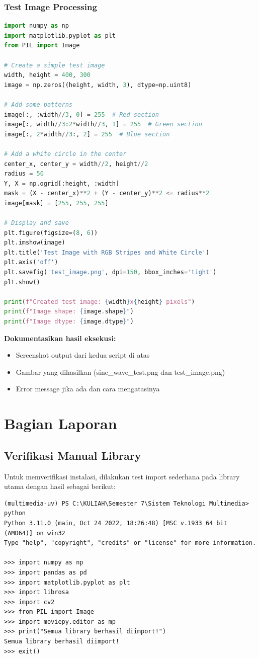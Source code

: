 \documentclass[11pt,a4paper]{article}
\begin{document}
\subsubsection{Test Image Processing}
\begin{lstlisting}[language=Python, caption=Test image processing sederhana]
import numpy as np
import matplotlib.pyplot as plt
from PIL import Image

# Create a simple test image
width, height = 400, 300
image = np.zeros((height, width, 3), dtype=np.uint8)

# Add some patterns
image[:, :width//3, 0] = 255  # Red section
image[:, width//3:2*width//3, 1] = 255  # Green section
image[:, 2*width//3:, 2] = 255  # Blue section

# Add a white circle in the center
center_x, center_y = width//2, height//2
radius = 50
Y, X = np.ogrid[:height, :width]
mask = (X - center_x)**2 + (Y - center_y)**2 <= radius**2
image[mask] = [255, 255, 255]

# Display and save
plt.figure(figsize=(8, 6))
plt.imshow(image)
plt.title('Test Image with RGB Stripes and White Circle')
plt.axis('off')
plt.savefig('test_image.png', dpi=150, bbox_inches='tight')
plt.show()

print(f"Created test image: {width}x{height} pixels")
print(f"Image shape: {image.shape}")
print(f"Image dtype: {image.dtype}")
\end{lstlisting}

\textbf{Dokumentasikan hasil eksekusi:}
\begin{itemize}
    \item Screenshot output dari kedua script di atas
    \item Gambar yang dihasilkan (sine\_wave\_test.png dan test\_image.png)
    \item Error message jika ada dan cara mengatasinya
\end{itemize}

\section{Bagian Laporan}

\subsection{Verifikasi Manual Library}
Untuk memverifikasi instalasi, dilakukan test import sederhana pada library utama dengan hasil sebagai berikut:

\begin{lstlisting}[caption=Output test import library multimedia]
(multimedia-uv) PS C:\KULIAH\Semester 7\Sistem Teknologi Multimedia> python
Python 3.11.0 (main, Oct 24 2022, 18:26:48) [MSC v.1933 64 bit (AMD64)] on win32
Type "help", "copyright", "credits" or "license" for more information.

>>> import numpy as np
>>> import pandas as pd  
>>> import matplotlib.pyplot as plt
>>> import librosa
>>> import cv2
>>> from PIL import Image
>>> import moviepy.editor as mp
>>> print("Semua library berhasil diimport!")
Semua library berhasil diimport!
>>> exit()
\end{lstlisting}
\end{document}

